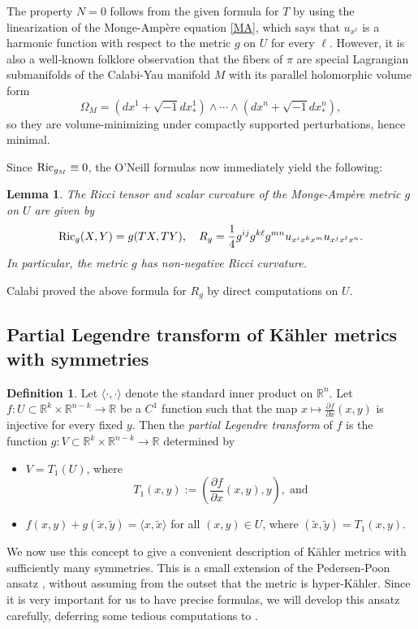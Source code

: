 \documentclass[11pt,reqno]{amsart}
\newcommand{\R}{\mathbb{R}}
\theoremstyle{plain}
\newtheorem{lemma}[theorem]{Lemma}
\theoremstyle{definition}
\newtheorem{definition}[theorem]{Definition}
\numberwithin{equation}{section}
\begin{document}
The property $N = 0$ follows from the given formula for $T$ by using the linearization of the Monge-Ampère equation \eqref{MA}, which says that $u_{x^\ell}$ is a harmonic function with respect to the metric $g$ on $U$ for every $\ell$. However, it is also a well-known folklore observation that the fibers of $\pi$ are special Lagrangian submanifolds of the Calabi-Yau manifold $M$ with its parallel holomorphic volume form $$\Omega_M = (dx^1 + \sqrt{-1} dx^1_*) \wedge \cdots \wedge (dx^n + \sqrt{-1} dx^n_*),$$ so they are volume-minimizing under compactly supported perturbations, hence minimal.

Since ${\rm Ric}_{g_M} \equiv 0$, the O'Neill formulas now immediately yield the following:

\begin{lemma}\label{SCT}
  The Ricci tensor and scalar curvature of the Monge-Ampère metric $g$ on $U$ are given by
 $${\rm Ric}_g(X,Y)=g(T X,T Y), \quad R_g =\frac{1}{4}{}g^{ij}g^{k\ell}g^{mn}u_{x^{i}x^{k}x^{m}}u_{x^{j}x^{\ell}x^{n}}.$$
In particular, the metric $g$ has non-negative Ricci curvature.
\end{lemma}

Calabi \cite[Eq. 2.8]{EC} proved the above formula for $R_g$ by direct computations on $U$. 

\subsection{Partial Legendre transform of Kähler metrics with symmetries}

\begin{definition}
    Let $\langle\cdot,\cdot\rangle$ denote the standard inner product on $\mathbb{R}^n$. Let $f:U\subset \R^{k} \times \R^{n-k}\to \R$ be a $C^{1}$ function such that the map $x \mapsto \frac{\partial f}{\partial x}(x,y)$ is injective for every fixed $y$. Then the \emph{partial Legendre transform} of $f$ is the function $g:V\subset \R^{k} \times \R^{n-k}\to \R$ determined by
    \begin{itemize}
    \item $V=T_{1}(U)$, where 
    $$T_{1}(x,y):=\left(\frac{\partial f}{\partial x}(x,y),y\right),\;\text{and}$$
    \item $f(x,y)+g(\tilde{x},\tilde{y})=\langle x,\tilde{x} \rangle$ for all $(x,y) \in U$, where $(\tilde{x},\tilde{y}) = T_1(x,y)$.
    \end{itemize}
\end{definition}

We now use this concept to give a convenient description of Kähler metrics with sufficiently many symmetries. This is a small extension of the Pedersen-Poon ansatz \cite{PP}, without assuming from the outset that the metric is hyper-Kähler. Since it is very important for us to have precise formulas, we will develop this ansatz carefully, deferring some tedious computations to \cite[Chapter 4.2]{JSAR}.
\end{document}
